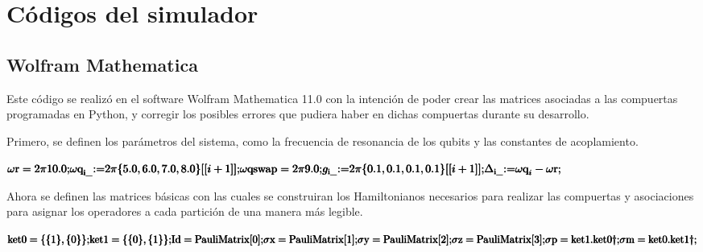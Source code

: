 \chapter{Códigos del simulador}

\section{Wolfram Mathematica}

Este código se realizó en el software Wolfram Mathematica 11.0 con la intención de poder crear las matrices asociadas a las compuertas programadas en Python, y corregir los posibles errores que pudiera haber en dichas compuertas durante su desarrollo.

Primero, se definen los parámetros del sistema, como la frecuencia de resonancia de los qubits y las constantes de acoplamiento.

\begin{doublespace}
\noindent\(\pmb{\text{$\omega $r}=2\pi  10.0;}\\
\pmb{\text{$\omega $q}_{\text{i$\_$}}\text{:=}2\pi \{5.0,6.0,7.0,8.0\}[[i+1]];}\\
\pmb{\text{$\omega $qswap}=2\pi  9.0;}\\
\pmb{g_{\text{i$\_$}}\text{:=}2\pi \{0.1,0.1,0.1,0.1\}[[i+1]];}\\
\pmb{\Delta _{\text{i$\_$}}\text{:=}\text{$\omega $q}_i-\text{$\omega $r};}\)
\end{doublespace}

Ahora se definen las matrices básicas con las cuales se construiran los Hamiltonianos necesarios para realizar las compuertas y asociaciones para asignar los operadores a cada partición de una manera más legible.

\begin{doublespace}
\noindent\(\pmb{\text{ket0}=\{\{1\},\{0\}\};}\\
\pmb{\text{ket1}=\{\{0\},\{1\}\};}\\
\pmb{\text{Id}=\text{PauliMatrix}[0];}\\
\pmb{\text{$\sigma $x}=\text{PauliMatrix}[1];}\\
\pmb{\text{$\sigma $y}=\text{PauliMatrix}[2];}\\
\pmb{\text{$\sigma $z}=\text{PauliMatrix}[3];}\\
\pmb{\text{$\sigma $p}=\text{ket1}.\text{ket0}\dagger;}\\
\pmb{\text{$\sigma $m}=\text{ket0}.\text{ket1}\dagger;}\\ \)
\end{doublespace}


